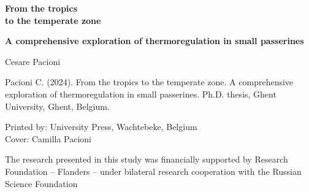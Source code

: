 \documentclass[10pt, twoside]{book} %
\begin{document}
%
\thispagestyle{mainmatter} %
	\frontmatter
	\pagestyle{frontmatter}
	\lstset{language=Perl}

\begin{titlepage}
    
    \begin{center}    
    
        \thispagestyle{empty}
        
        \vspace*{3.00cm}
        
        {\centering \huge \textbf{From the tropics \\ to the temperate zone} \par}
        \vspace{0.5cm}
        {\Large \textbf{A comprehensive exploration of thermoregulation in small passerines} \par}
        
        \vspace{7.0 cm}
        
    \end{center}
    
\end{titlepage}

\newpage
		
	\color{black}
	\newpage 
	\thispagestyle{empty}

	\vspace*{\fill}

	\begin{small}

	\noindent {} Cesare Pacioni

	\vspace{0.5cm}	

	\noindent Pacioni C. (2024). From the tropics to the temperate zone. A comprehensive exploration of thermoregulation in small passerines. Ph.D. thesis, Ghent University, Ghent, Belgium.

	\vspace{0.5cm}	

\noindent Printed by: University Press, Wachtebeke, Belgium\\
Cover: Camilla Pacioni\\

	\vspace*{0.5cm}
	
	\noindent The research presented in this study was financially supported by Research Foundation – Flanders – under bilateral research cooperation with the Russian Science Foundation
	
	\vspace{1cm}
\end{small}	
\end{document}
